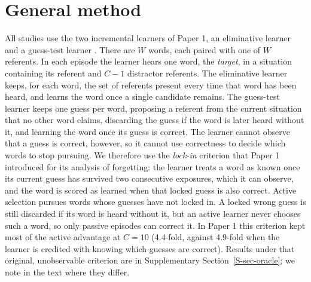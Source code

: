 \documentclass[a4paper,natbib,man]{apa6}
\begin{document}
\section{General method}
\label{sec-method}

All studies use the two incremental learners of Paper 1, an eliminative learner \citep[after][]{Siskind:1996,Vogt:2012} and a guess-test learner \citep[after][]{Trueswell:2013}. There are $W$ words, each paired with one of $W$ referents. In each episode the learner hears one word, the \textit{target}, in a situation containing its referent and $C-1$ distractor referents. The eliminative learner keeps, for each word, the set of referents present every time that word has been heard, and learns the word once a single candidate remains. The guess-test learner keeps one guess per word, proposing a referent from the current situation that no other word claims, discarding the guess if the word is later heard without it, and learning the word once its guess is correct. The learner cannot observe that a guess is correct, however, so it cannot use correctness to decide which words to stop pursuing. We therefore use the \textit{lock-in} criterion that Paper 1 introduced for its analysis of forgetting: the learner treats a word as known once its current guess has survived two consecutive exposures, which it can observe, and the word is scored as learned when that locked guess is also correct. Active selection pursues words whose guesses have not locked in. A locked wrong guess is still discarded if its word is heard without it, but an active learner never chooses such a word, so only passive episodes can correct it. In Paper 1 this criterion kept most of the active advantage at $C=10$ (4.4-fold, against 4.9-fold when the learner is credited with knowing which guesses are correct). Results under that original, unobservable criterion are in Supplementary Section~\ref{S-sec-oracle}; we note in the text where they differ.
\end{document}
